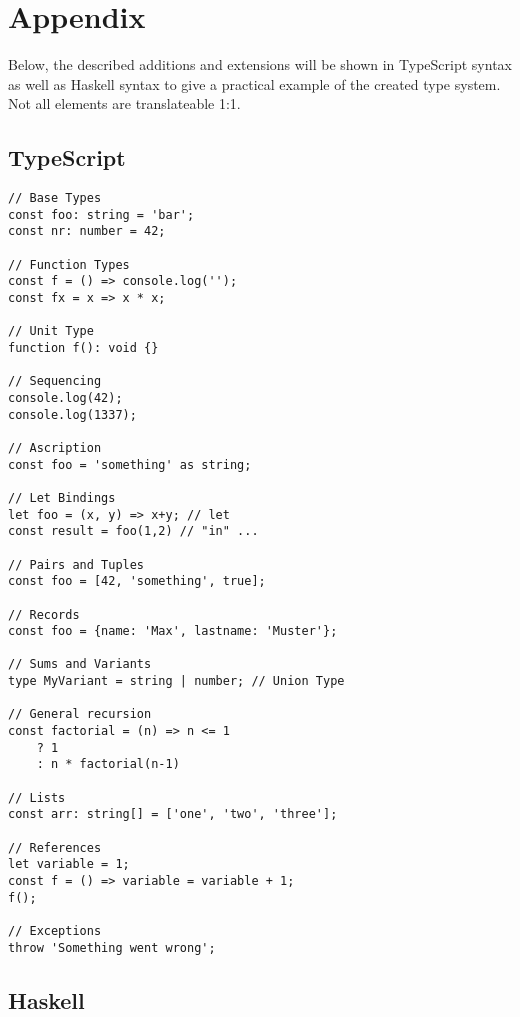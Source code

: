\section*{Appendix}

Below, the described additions and extensions will be shown in
TypeScript syntax as well as Haskell syntax to give a practical
example of the created type system. Not all elements are
translateable 1:1.

\subsection*{TypeScript}

\begin{verbatim}
// Base Types
const foo: string = 'bar';
const nr: number = 42;

// Function Types
const f = () => console.log('');
const fx = x => x * x;

// Unit Type
function f(): void {}

// Sequencing
console.log(42);
console.log(1337);

// Ascription
const foo = 'something' as string;

// Let Bindings
let foo = (x, y) => x+y; // let
const result = foo(1,2) // "in" ...

// Pairs and Tuples
const foo = [42, 'something', true];

// Records
const foo = {name: 'Max', lastname: 'Muster'};

// Sums and Variants
type MyVariant = string | number; // Union Type

// General recursion
const factorial = (n) => n <= 1
    ? 1
    : n * factorial(n-1)

// Lists
const arr: string[] = ['one', 'two', 'three'];

// References
let variable = 1;
const f = () => variable = variable + 1;
f();

// Exceptions
throw 'Something went wrong';
\end{verbatim}

\subsection*{Haskell}

